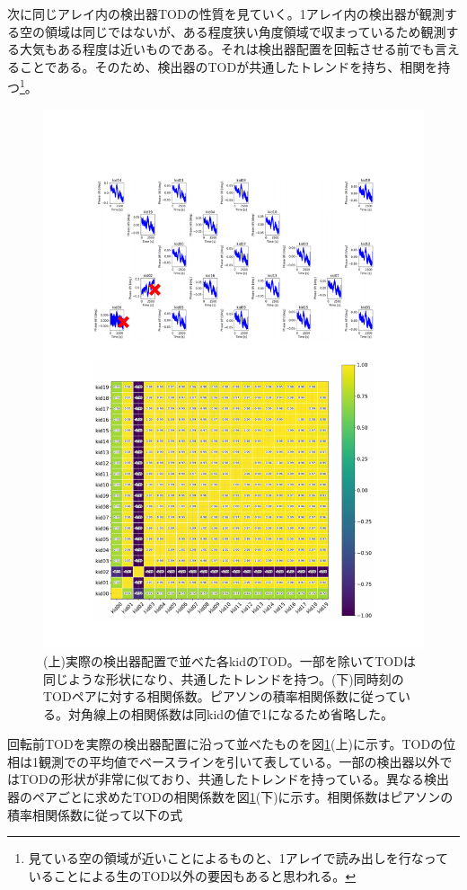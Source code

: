 次に同じアレイ内の検出器TODの性質を見ていく。1アレイ内の検出器が観測する空の領域は同じではないが、ある程度狭い角度領域で収まっているため観測する大気もある程度は近いものである。それは検出器配置を回転させる前でも言えることである。そのため、検出器のTODが共通したトレンドを持ち、相関を持つ\footnote{見ている空の領域が近いことによるものと、1アレイで読み出しを行なっていることによる生のTOD以外の要因もあると思われる。}。
\begin{figure}[htbp]
  \centering
  \includegraphics[width=1.0\columnwidth]{5_alignment/figs/9011_tod_cor_combined.pdf}
  \caption{(上)実際の検出器配置で並べた各kidのTOD。一部を除いてTODは同じような形状になり、共通したトレンドを持つ。(下)同時刻のTODペアに対する相関係数。ピアソンの積率相関係数に従っている。対角線上の相関係数は同kidの値で1になるため省略した。}
  \label{9011_tod_cor_combined}
\end{figure}
回転前TODを実際の検出器配置に沿って並べたものを図\ref{9011_tod_cor_combined}(上)に示す。TODの位相は1観測での平均値でベースラインを引いて表している。一部の検出器以外ではTODの形状が非常に似ており、共通したトレンドを持っている。異なる検出器のペアごとに求めたTODの相関係数を図\ref{9011_tod_cor_combined}(下)に示す。相関係数はピアソンの積率相関係数に従って以下の式
